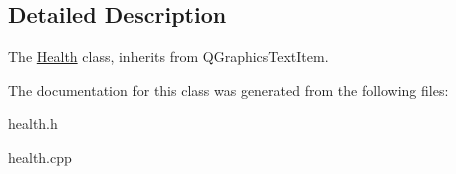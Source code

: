 \subsection{Detailed Description}
The \hyperlink{classHealth}{Health} class, inherits from Q\+Graphics\+Text\+Item. 

The documentation for this class was generated from the following files\+:\begin{DoxyCompactItemize}
\item 
health.\+h\item 
health.\+cpp\end{DoxyCompactItemize}
